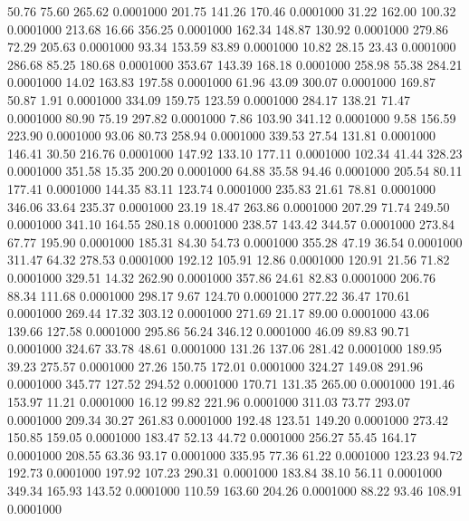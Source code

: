   50.76   75.60  265.62   0.0001000
 201.75  141.26  170.46   0.0001000
  31.22  162.00  100.32   0.0001000
 213.68   16.66  356.25   0.0001000
 162.34  148.87  130.92   0.0001000
 279.86   72.29  205.63   0.0001000
  93.34  153.59   83.89   0.0001000
  10.82   28.15   23.43   0.0001000
 286.68   85.25  180.68   0.0001000
 353.67  143.39  168.18   0.0001000
 258.98   55.38  284.21   0.0001000
  14.02  163.83  197.58   0.0001000
  61.96   43.09  300.07   0.0001000
 169.87   50.87    1.91   0.0001000
 334.09  159.75  123.59   0.0001000
 284.17  138.21   71.47   0.0001000
  80.90   75.19  297.82   0.0001000
   7.86  103.90  341.12   0.0001000
   9.58  156.59  223.90   0.0001000
  93.06   80.73  258.94   0.0001000
 339.53   27.54  131.81   0.0001000
 146.41   30.50  216.76   0.0001000
 147.92  133.10  177.11   0.0001000
 102.34   41.44  328.23   0.0001000
 351.58   15.35  200.20   0.0001000
  64.88   35.58   94.46   0.0001000
 205.54   80.11  177.41   0.0001000
 144.35   83.11  123.74   0.0001000
 235.83   21.61   78.81   0.0001000
 346.06   33.64  235.37   0.0001000
  23.19   18.47  263.86   0.0001000
 207.29   71.74  249.50   0.0001000
 341.10  164.55  280.18   0.0001000
 238.57  143.42  344.57   0.0001000
 273.84   67.77  195.90   0.0001000
 185.31   84.30   54.73   0.0001000
 355.28   47.19   36.54   0.0001000
 311.47   64.32  278.53   0.0001000
 192.12  105.91   12.86   0.0001000
 120.91   21.56   71.82   0.0001000
 329.51   14.32  262.90   0.0001000
 357.86   24.61   82.83   0.0001000
 206.76   88.34  111.68   0.0001000
 298.17    9.67  124.70   0.0001000
 277.22   36.47  170.61   0.0001000
 269.44   17.32  303.12   0.0001000
 271.69   21.17   89.00   0.0001000
  43.06  139.66  127.58   0.0001000
 295.86   56.24  346.12   0.0001000
  46.09   89.83   90.71   0.0001000
 324.67   33.78   48.61   0.0001000
 131.26  137.06  281.42   0.0001000
 189.95   39.23  275.57   0.0001000
  27.26  150.75  172.01   0.0001000
 324.27  149.08  291.96   0.0001000
 345.77  127.52  294.52   0.0001000
 170.71  131.35  265.00   0.0001000
 191.46  153.97   11.21   0.0001000
  16.12   99.82  221.96   0.0001000
 311.03   73.77  293.07   0.0001000
 209.34   30.27  261.83   0.0001000
 192.48  123.51  149.20   0.0001000
 273.42  150.85  159.05   0.0001000
 183.47   52.13   44.72   0.0001000
 256.27   55.45  164.17   0.0001000
 208.55   63.36   93.17   0.0001000
 335.95   77.36   61.22   0.0001000
 123.23   94.72  192.73   0.0001000
 197.92  107.23  290.31   0.0001000
 183.84   38.10   56.11   0.0001000
 349.34  165.93  143.52   0.0001000
 110.59  163.60  204.26   0.0001000
  88.22   93.46  108.91   0.0001000
